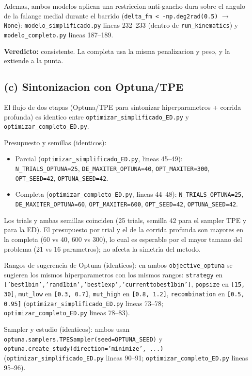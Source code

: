 \documentclass[11pt,a4paper]{article}
\newcommand{\code}[1]{\texttt{#1}}
\begin{document}
Ademas, ambos modelos aplican una restriccion anti-gancho dura sobre el angulo de
la falange medial durante el barrido (\code{delta\_fm < -np.deg2rad(0.5)}
$\to$ \code{None}): \code{modelo\_simplificado.py} lineas 232--233 (dentro de
\code{run\_kinematics}) y \code{modelo\_completo.py} lineas 187--189.

\textbf{Veredicto:} consistente. La completa usa la misma penalizacion y peso, y
la extiende a la punta.

\subsection{(c) Sintonizacion con Optuna/TPE}

El flujo de dos etapas (Optuna/TPE para sintonizar hiperparametros + corrida
profunda) es identico entre \code{optimizar\_simplificado\_ED.py} y
\code{optimizar\_completo\_ED.py}.

Presupuesto y semillas (identicos):

\begin{itemize}[leftmargin=1.4em]
  \item Parcial (\code{optimizar\_simplificado\_ED.py}, lineas 45--49):
        \code{N\_TRIALS\_OPTUNA=25}, \code{DE\_MAXITER\_OPTUNA=40},
        \code{OPT\_MAXITER=300}, \code{OPT\_SEED=42}, \code{OPTUNA\_SEED=42}.
  \item Completa (\code{optimizar\_completo\_ED.py}, lineas 44--48):
        \code{N\_TRIALS\_OPTUNA=25}, \code{DE\_MAXITER\_OPTUNA=60},
        \code{OPT\_MAXITER=600}, \code{OPT\_SEED=42}, \code{OPTUNA\_SEED=42}.
\end{itemize}

Los trials y ambas semillas coinciden (25 trials, semilla 42 para el sampler TPE
y para la ED). El presupuesto por trial y el de la corrida profunda son mayores
en la completa (60 vs 40, 600 vs 300), lo cual es esperable por el mayor tamano
del problema (21 vs 16 parametros); no afecta la simetria del metodo.

Rangos de sugerencia de Optuna (identicos): en ambos \code{objective\_optuna} se
sugieren los mismos hiperparametros con los mismos rangos: \code{strategy} en
\code{['best1bin','rand1bin','best1exp','currenttobest1bin']}, \code{popsize} en
\code{[15, 30]}, \code{mut\_low} en \code{[0.3, 0.7]}, \code{mut\_high} en
\code{[0.8, 1.2]}, \code{recombination} en \code{[0.5, 0.95]}
(\code{optimizar\_simplificado\_ED.py} lineas 73--78;
\code{optimizar\_completo\_ED.py} lineas 78--83).

Sampler y estudio (identicos): ambos usan
\code{optuna.samplers.TPESampler(seed=OPTUNA\_SEED)} y
\code{optuna.create\_study(direction='minimize', ...)}
(\code{optimizar\_simplificado\_ED.py} lineas 90--91;
\code{optimizar\_completo\_ED.py} lineas 95--96).
\end{document}
